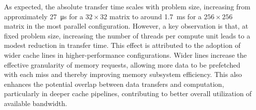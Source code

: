                 As expected, the absolute transfer time scales with problem size, increasing from approximately \SI{27}{\micro\second} for a $32\times32$ matrix to around \SI{1.7}{\milli\second} for a $256\times256$ matrix in the most parallel configuration. However, a key observation is that, at fixed problem size, increasing the number of threads per compute unit leads to a modest reduction in transfer time. This effect is attributed to the adoption of wider cache lines in higher-performance configurations. Wider lines increase the effective granularity of memory requests, allowing more data to be prefetched with each miss and thereby improving memory subsystem efficiency. This also enhances the potential overlap between data transfers and computation, particularly in deeper cache pipelines, contributing to better overall utilization of available bandwidth.

